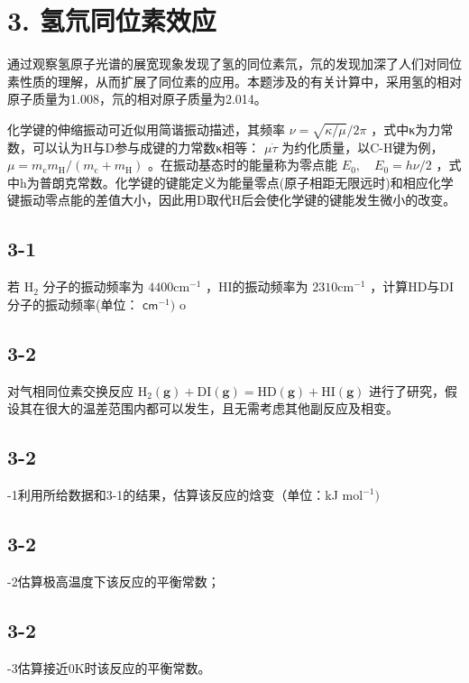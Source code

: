 \section*{3. 氢氘同位素效应}
通过观察氢原子光谱的展宽现象发现了氢的同位素氘，氘的发现加深了人们对同位素性质的理解，从而扩展了同位素的应用。本题涉及的有关计算中，采用氢的相对原子质量为1.008，氘的相对原子质量为2.014。

化学键的伸缩振动可近似用简谐振动描述，其频率 $\nu = \sqrt { \kappa / \mu } / 2 \pi$ ，式中κ为力常数，可以认为H与D参与成键的力常数κ相等： $\mu \dot { \tau }$ 为约化质量，以C-H键为例，$\mu { = } m _ { \mathrm { c } } m _ { \mathrm { H } } / ( m _ { \mathrm { c } } + m _ { \mathrm { H } } )$ 。在振动基态时的能量称为零点能 $E _ { 0 } , \quad E _ { 0 } = h \nu / 2$ ，式中h为普朗克常数。化学键的键能定义为能量零点(原子相距无限远时)和相应化学键振动零点能的差值大小，因此用D取代H后会使化学键的键能发生微小的改变。

\subsection*{3-1}
若 $\mathrm { H } _ { 2 }$ 分子的振动频率为 $4 4 0 0 \mathrm { c m } ^ { - 1 }$ ，HI的振动频率为 $2 3 1 0 \mathrm { c m ^ { - 1 } }$ ，计算HD与DI分子的振动频率(单位： $\mathsf { c m } ^ { - 1 } )$ o

\subsection*{3-2}
对气相同位素交换反应 $\mathrm { H } _ { 2 } ( \mathbf { g } ) + \mathrm { D I } ( \mathbf { g } ) = \mathrm { H D } ( \mathbf { g } ) + \mathrm { H I } ( \mathbf { g } )$ 进行了研究，假设其在很大的温差范围内都可以发生，且无需考虑其他副反应及相变。

\subsection*{3-2}
-1利用所给数据和3-1的结果，估算该反应的焓变（单位：kJ $\mathrm { m o l ^ { - 1 } } )$

\subsection*{3-2}
-2估算极高温度下该反应的平衡常数；

\subsection*{3-2}
-3估算接近0K时该反应的平衡常数。

